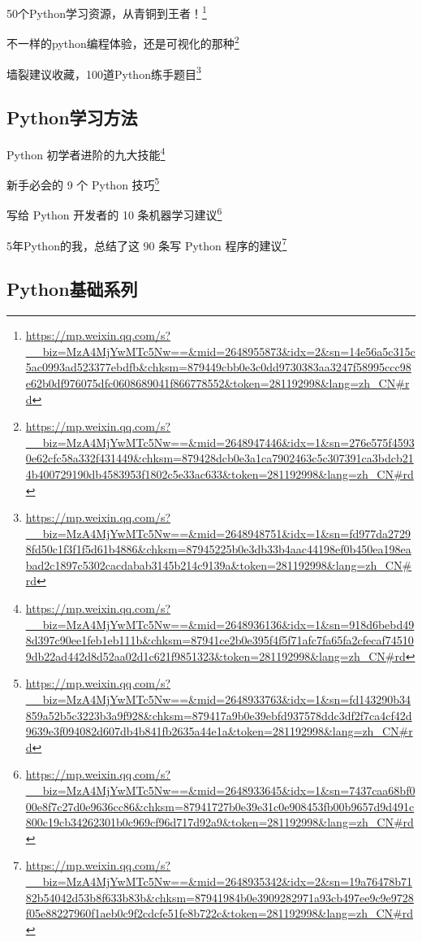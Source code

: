 \documentclass[]{ctexbook}
\renewcommand{\href}[2]{#2\footnote{\url{#1}}}
\begin{document}
\href{https://mp.weixin.qq.com/s?__biz=MzA4MjYwMTc5Nw==\&mid=2648955873\&idx=2\&sn=14e56a5c315c5ac0993ad523377ebdfb\&chksm=879449cbb0e3c0dd9730383aa3247f58995ccc98e62b0df976075dfc0608689041f866778552\&token=281192998\&lang=zh_CN\#rd}{50个Python学习资源，从青铜到王者！}

\href{https://mp.weixin.qq.com/s?__biz=MzA4MjYwMTc5Nw==\&mid=2648947446\&idx=1\&sn=276e575f45930e62cfc58a332f431449\&chksm=879428dcb0e3a1ca7902463c5c307391ca3bdcb214b400729190db4583953f1802c5e33ac633\&token=281192998\&lang=zh_CN\#rd}{不一样的python编程体验，还是可视化的那种}

\href{https://mp.weixin.qq.com/s?__biz=MzA4MjYwMTc5Nw==\&mid=2648948751\&idx=1\&sn=fd977da27298fd50c1f3f1f5d61b4886\&chksm=87945225b0e3db33b4aac44198ef0b450ea198eabad2c1897c5302cacdabab3145b214c9139a\&token=281192998\&lang=zh_CN\#rd}{墙裂建议收藏，100道Python练手题目}

\hypertarget{pythonux5b66ux4e60ux65b9ux6cd5}{%
\subsection{Python学习方法}\label{pythonux5b66ux4e60ux65b9ux6cd5}}

\href{https://mp.weixin.qq.com/s?__biz=MzA4MjYwMTc5Nw==\&mid=2648936136\&idx=1\&sn=918d6bebd498d397c90ee1feb1eb111b\&chksm=87941ce2b0e395f4f5f71afc7fa65fa2cfecaf745109db22ad442d8d52aa02d1c621f9851323\&token=281192998\&lang=zh_CN\#rd}{Python 初学者进阶的九大技能}

\href{https://mp.weixin.qq.com/s?__biz=MzA4MjYwMTc5Nw==\&mid=2648933763\&idx=1\&sn=fd143290b34859a52b5c3223b3a9f928\&chksm=879417a9b0e39ebfd937578ddc3df2f7ca4cf42d9639e3f094082d607db4b841fb2635a44e1a\&token=281192998\&lang=zh_CN\#rd}{新手必会的 9 个 Python 技巧}

\href{https://mp.weixin.qq.com/s?__biz=MzA4MjYwMTc5Nw==\&mid=2648933645\&idx=1\&sn=7437caa68bf000e8f7c27d0e9636cc86\&chksm=87941727b0e39e31c0e908453fb00b9657d9d491c800c19cb34262301b0c969cf96d717d92a9\&token=281192998\&lang=zh_CN\#rd}{写给 Python 开发者的 10 条机器学习建议}

\href{https://mp.weixin.qq.com/s?__biz=MzA4MjYwMTc5Nw==\&mid=2648935342\&idx=2\&sn=19a76478b7182b54042d53b8f633b83b\&chksm=87941984b0e3909282971a93cb497ee9c9e9728f05e88227960f1aeb0c9f2cdcfe51fe8b722c\&token=281192998\&lang=zh_CN\#rd}{5年Python的我，总结了这 90 条写 Python 程序的建议}

\hypertarget{pythonux57faux7840ux7cfbux5217}{%
\subsection{Python基础系列}\label{pythonux57faux7840ux7cfbux5217}}
\end{document}
